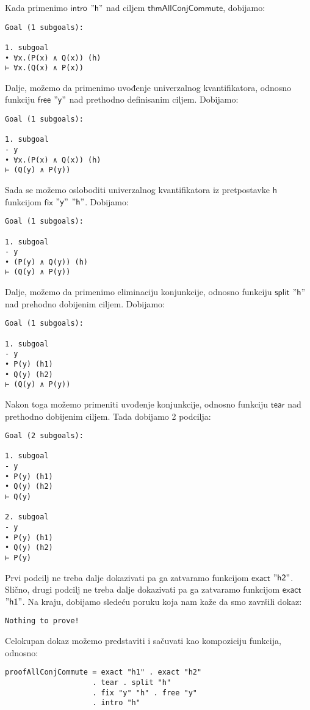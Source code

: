 \documentclass[a4paper,10pt]{article}
\theoremstyle{definition}
\begin{document}
Kada primenimo $\mathsf{intro}$ $"\mathsf{h}"$ nad ciljem $\mathsf{thmAllConjCommute}$, dobijamo:
\begin{verbatim}
Goal (1 subgoals):

1. subgoal
• ∀x.(P(x) ∧ Q(x)) (h)
⊢ ∀x.(Q(x) ∧ P(x))
\end{verbatim}
Dalje, možemo da primenimo uvođenje univerzalnog kvantifikatora, odnosno funkciju $\mathsf{free}$ $"\mathsf{y}"$ nad prethodno definisanim ciljem. Dobijamo:
\begin{verbatim}
Goal (1 subgoals):

1. subgoal
- y
• ∀x.(P(x) ∧ Q(x)) (h)
⊢ (Q(y) ∧ P(y))
\end{verbatim}
Sada se možemo osloboditi univerzalnog kvantifikatora iz pretpostavke $\mathsf{h}$ funkcijom $\mathsf{fix}$ $"\mathsf{y}"$ $"\mathsf{h}"$. Dobijamo:
\begin{verbatim}
Goal (1 subgoals):

1. subgoal
- y
• (P(y) ∧ Q(y)) (h)
⊢ (Q(y) ∧ P(y))
\end{verbatim}
Dalje, možemo da primenimo eliminaciju konjunkcije, odnosno funkciju $\mathsf{split}$ $"\mathsf{h}"$ nad prehodno dobijenim ciljem. Dobijamo:
\begin{verbatim}
Goal (1 subgoals):

1. subgoal
- y
• P(y) (h1)
• Q(y) (h2)
⊢ (Q(y) ∧ P(y))
\end{verbatim}
Nakon toga možemo primeniti uvođenje konjunkcije, odnosno funkciju $\mathsf{tear}$ nad prethodno dobijenim ciljem. Tada dobijamo 2 podcilja:
\begin{verbatim}
Goal (2 subgoals):

1. subgoal
- y
• P(y) (h1)
• Q(y) (h2)
⊢ Q(y)

2. subgoal
- y
• P(y) (h1)
• Q(y) (h2)
⊢ P(y)
\end{verbatim}
Prvi podcilj ne treba dalje dokazivati pa ga zatvaramo funkcijom $\mathsf{exact}$ $"\mathsf{h2}"$. Slično, drugi podcilj ne treba dalje dokazivati pa ga zatvaramo funkcijom $\mathsf{exact}$ $"\mathsf{h1}"$. Na kraju, dobijamo sledeću poruku koja nam kaže da smo završili dokaz:
\begin{verbatim}
Nothing to prove!
\end{verbatim}

Celokupan dokaz možemo predstaviti i sačuvati kao kompoziciju funkcija, odnosno:
\begin{lstlisting}
proofAllConjCommute = exact "h1" . exact "h2" 
                    . tear . split "h" 
                    . fix "y" "h" . free "y"
                    . intro "h"
\end{lstlisting}
\end{document}
